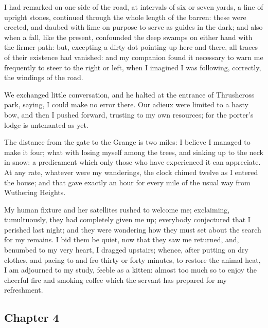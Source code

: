 \par I had remarked on one side of the road, at intervals of six or seven yards, a line of upright stones, continued through the whole length of the barren: these were erected, and daubed with lime on purpose to serve as guides in the dark; and also when a fall, like the present, confounded the deep swamps on either hand with the firmer path: but, excepting a dirty dot pointing up here and there, all traces of their existence had vanished: and my companion found it necessary to warn me frequently to steer to the right or left, when I imagined I was following, correctly, the windings of the road.
\par We exchanged little conversation, and he halted at the entrance of Thrushcross park, saying, I could make no error there. Our adieux were limited to a hasty bow, and then I pushed forward, trusting to my own resources; for the porter's lodge is untenanted as yet.
\par The distance from the gate to the Grange is two miles: I believe I managed to make it four; what with losing myself among the trees, and sinking up to the neck in snow: a predicament which only those who have experienced it can appreciate. At any rate, whatever were my wanderings, the clock chimed twelve as I entered the house; and that gave exactly an hour for every mile of the usual way from Wuthering Heights.
\par My human fixture and her satellites rushed to welcome me; exclaiming, tumultuously, they had completely given me up; everybody conjectured that I perished last night; and they were wondering how they must set about the search for my remains. I bid them be quiet, now that they saw me returned, and, benumbed to my very heart, I dragged upstairs; whence, after putting on dry clothes, and pacing to and fro thirty or forty minutes, to restore the animal heat, I am adjourned to my study, feeble as a kitten: almost too much so to enjoy the cheerful fire and smoking coffee which the servant has prepared for my refreshment.




\subsection*{Chapter 4}



